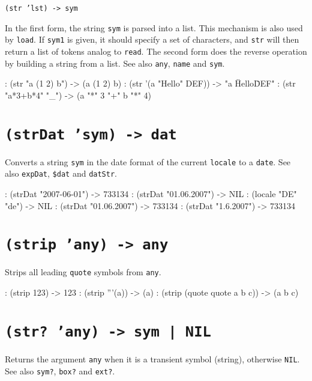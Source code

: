 \texttt{(str 'lst) -> sym}

In the first form, the string \texttt{sym} is parsed into a list. This
mechanism is also used by \texttt{load}. If \texttt{sym1} is given, it should specify
a set of characters, and \texttt{str} will then return a list of tokens analog
to \texttt{read}. The second form does the reverse operation by building a
string from a list. See also \texttt{any}, \texttt{name} and \texttt{sym}.


\begin{wideverbatim}
: (str "a (1 2) b")
-> (a (1 2) b)
: (str '(a "Hello" DEF))
-> "a \"Hello\" DEF"
: (str "a*3+b*4" "_")
-> (a "*" 3 "+" b "*" 4)
\end{wideverbatim}

 
\section*{\texttt{(strDat 'sym) -> dat}}
\label{sec:func-ref-S-(strDat 'sym) -> dat}


Converts a string \texttt{sym} in the date format of the current \texttt{locale} to a
\texttt{date}. See also \texttt{expDat}, \texttt{\$dat} and \texttt{datStr}.


\begin{wideverbatim}
: (strDat "2007-06-01")
-> 733134
: (strDat "01.06.2007")
-> NIL
: (locale "DE" "de")
-> NIL
: (strDat "01.06.2007")
-> 733134
: (strDat "1.6.2007")
-> 733134
\end{wideverbatim}

 
\section*{\texttt{(strip 'any) -> any}}
\label{sec:func-ref-S-(strip 'any) -> any}


Strips all leading \texttt{quote} symbols from \texttt{any}.


\begin{wideverbatim}
: (strip 123)
-> 123
: (strip '''(a))
-> (a)
: (strip (quote quote a b c))
-> (a b c)
\end{wideverbatim}

 
\section*{\texttt{(str? 'any) -> sym | NIL}}
\label{sec:func-ref-S-(str? 'any) -> sym | NIL}


Returns the argument \texttt{any} when it is a transient symbol (string),
otherwise \texttt{NIL}. See also \texttt{sym?}, \texttt{box?} and \texttt{ext?}.


